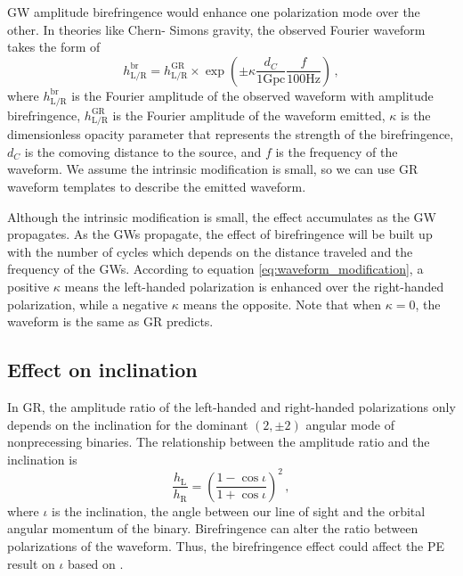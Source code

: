 \documentclass[aps,prd,twocolumn,superscriptaddress,preprintnumbers,floatfix,nofootinbib]{revtex4-2}
\begin{document}
GW amplitude birefringence would enhance one polarization mode over the other.
In theories like Chern- Simons gravity, the observed Fourier waveform takes the form of
\begin{equation}
    h_\mathrm{L/R}^{\mathrm{br}}=
    h_\mathrm{L/R}^{\mathrm{GR}}\times
    \exp\left(\pm\kappa\frac{d_C}{1\mathrm{Gpc}}\frac{f}{100\mathrm{Hz}}\right)\,,
    \label{eq:waveform_modification}
\end{equation}
where $h_\mathrm{L/R}^{\mathrm{br}}$ is the Fourier amplitude of the observed waveform with amplitude birefringence, $h_\mathrm{L/R}^{\mathrm{GR}}$ is the Fourier amplitude of the waveform emitted, $\kappa$ is the dimensionless opacity parameter that represents the strength of the birefringence, $d_C$ is the comoving distance to the source, and $f$ is the frequency of the waveform.
We assume the intrinsic modification is small, so we can use GR waveform templates to describe the emitted waveform.

Although the intrinsic modification is small, the effect accumulates as the GW propagates.
As the GWs propagate, the effect of birefringence will be built up with the number of cycles which depends on the distance traveled and the frequency of the GWs.
According to equation \ref{eq:waveform_modification}, a positive $\kappa$ means the left-handed polarization is enhanced over the right-handed polarization, while a negative $\kappa$ means the opposite.
Note that when $\kappa=0$, the waveform is the same as GR predicts.

\subsection{Effect on inclination}
In GR, the amplitude ratio of the left-handed and right-handed polarizations only depends on the inclination for the dominant $(2,\pm 2)$ angular mode of nonprecessing binaries.
The relationship between the amplitude ratio and the inclination is
\begin{equation}
    \frac{h_\mathrm{L}}{h_\mathrm{R}}=\left(\frac{1-\cos\iota}{1+\cos\iota}\right)^2\,,
\end{equation}
where $\iota$ is the inclination, the angle between our line of sight and the orbital angular momentum of the binary.
Birefringence can alter the ratio between polarizations of the waveform.
Thus, the birefringence effect could affect the PE result on $\iota$ based on \citet{Okounkova_2022}.
\end{document}
